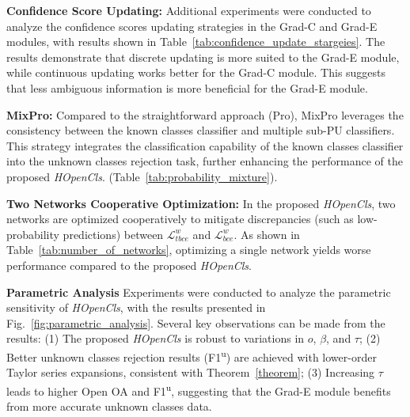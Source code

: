 \noindent \textbf{Confidence Score Updating:}
Additional experiments were conducted to analyze the confidence scores updating strategies in the Grad-C and Grad-E modules, with results shown in Table~\ref{tab:confidence_update_stargeies}. The results demonstrate that discrete updating is more suited to the Grad-E module, while continuous updating works better for the Grad-C module. This suggests that less ambiguous information is more beneficial for the Grad-E module.



\noindent \textbf{MixPro:}
Compared to the straightforward approach (Pro), MixPro leverages the consistency between the known classes classifier and multiple sub-PU classifiers. This strategy integrates the classification capability of the known classes classifier into the unknown classes rejection task, further enhancing the performance of the proposed \textit{HOpenCls}. (Table~\ref{tab:probability_mixture}).





\noindent \textbf{Two Networks Cooperative Optimization:}
In the proposed \textit{HOpenCls}, two networks are optimized cooperatively to mitigate discrepancies (such as low-probability predictions) between $\mathcal{L}_{tbce}^{w}$ and $\mathcal{L}_{bce}^{w}$. As shown in Table~\ref{tab:number_of_networks}, optimizing a single network yields worse performance compared to the proposed \textit{HOpenCls}.

\noindent \textbf{Parametric Analysis}
Experiments were conducted to analyze the parametric sensitivity of \textit{HOpenCls}, with the results presented in Fig.~\ref{fig:parametric_analysis}. Several key observations can be made from the results: (1) The proposed \textit{HOpenCls} is robust to variations in $o$, $\beta$, and $\tau$; (2) Better unknown classes rejection results (F1\textsuperscript{u}) are achieved with lower-order Taylor series expansions, consistent with Theorem~\ref{theorem}; (3) Increasing $\tau$ leads to higher Open OA and F1\textsuperscript{u}, suggesting that the Grad-E module benefits from more accurate unknown classes data.